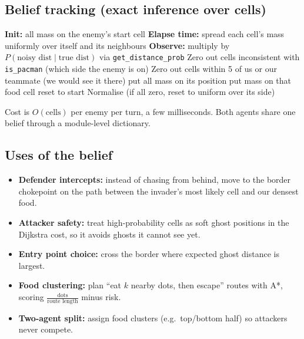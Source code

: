 \documentclass[11pt,a4paper]{article}
\begin{document}
\subsection{Belief tracking (exact inference over cells)}
\begin{algorithm}[H]
\caption{Per-enemy belief update (each turn)}
\begin{algorithmic}[1]
\State \textbf{Init:} all mass on the enemy's start cell
\State \textbf{Elapse time:} spread each cell's mass uniformly over itself and its neighbours
\State \textbf{Observe:} multiply by $P(\text{noisy dist}\mid \text{true dist})$ via \texttt{get\_distance\_prob}
\State Zero out cells inconsistent with \texttt{is\_pacman} (which side the enemy is on)
\State Zero out cells within 5 of us or our teammate (we would see it there)
 \State put all mass on its position \EndIf
{} \State put mass on that food cell \EndIf
{} \State reset to start \EndIf
\State Normalise (if all zero, reset to uniform over its side)
\end{algorithmic}
\end{algorithm}
\noindent Cost is $O(\text{cells})$ per enemy per turn, a few milliseconds. Both agents share one belief
through a module-level dictionary.

\subsection{Uses of the belief}
\begin{itemize}
  \item \textbf{Defender intercepts:} instead of chasing from behind, move to the border chokepoint on
        the path between the invader's most likely cell and our densest food.
  \item \textbf{Attacker safety:} treat high-probability cells as soft ghost positions in the Dijkstra cost,
        so it avoids ghosts it cannot see yet.
  \item \textbf{Entry point choice:} cross the border where expected ghost distance is largest.
  \item \textbf{Food clustering:} plan ``eat $k$ nearby dots, then escape'' routes with A*,
        scoring $\frac{\text{dots}}{\text{route length}}$ minus risk.
  \item \textbf{Two-agent split:} assign food clusters (e.g.\ top/bottom half) so attackers never compete.
\end{itemize}
\end{document}
